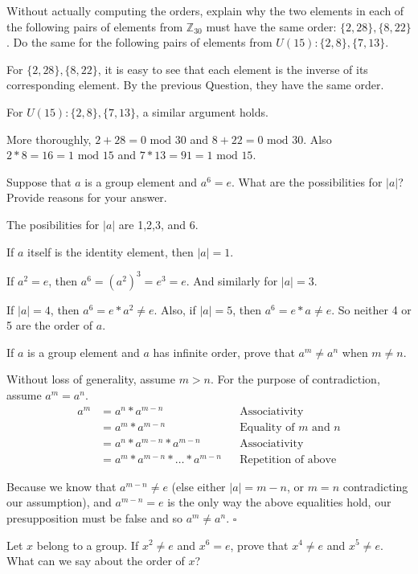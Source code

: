 \documentclass[11pt,largemargins]{homework}
\begin{document}
\question
Without actually computing the orders, explain why the two elements in each of the following pairs of elements from $\mathbb{Z}_{30}$ 
must have the same order: $\{2,28\}, \{8,22\}$. Do the same for the following pairs of elements from $U(15):\{2,8\}, \{7,13\}$.

\quad For $\{2,28\}, \{8,22\}$, it is easy to see that each element is the inverse of its corresponding element. By the previous 
Question, they have the same order.

\quad For $U(15):\{2,8\}, \{7,13\}$, a similar argument holds. 

\quad More thoroughly, $2+28 = 0\text{ mod }30$ and $8+22 = 0\text{ mod }30$. Also $2*8=16=1\text{ mod }15$ and 
$7*13=91=1\text{ mod }15$.

\question
Suppose that $a$ is a group element and $a^6=e$. What are the possibilities for $|a|$? Provide reasons for your answer.

\quad The posibilities for $|a|$ are 1,2,3, and 6. 

If $a$ itself is the identity element, then $|a|=1$. 

If $a^2=e$, then $a^6=(a^2)^3=e^3=e$. And similarly for $|a|=3$.

If $|a|=4$, then $a^6=e*a^2\neq e$. Also, if $|a|=5$, then $a^6=e*a\neq e$. So neither 4 or 5 are the order of $a$.

\question
If $a$ is a group element and $a$ has infinite order, prove that $a^m\neq a^n$ when $m\neq n$.

\quad Without loss of generality, assume $m>n$. For the purpose of contradiction, assume $a^m=a^n$.
\begin{align*}
    a^m &= a^n*a^{m-n}               &    &\text{Associativity}\\
        &= a^m*a^{m-n}               &    &\text{Equality of $m$ and $n$}\\
        &= a^n*a^{m-n}*a^{m-n}       &    &\text{Associativity}\\
        &= a^m*a^{m-n}*\dots*a^{m-n} &    &\text{Repetition of above}
\end{align*}

\quad Because we know that $a^{m-n}\neq e$ (else either $|a|=m-n$, or $m=n$ contradicting our assumption), and $a^{m-n}=e$ is the 
only way the above equalities hold, our presupposition must be false and so $a^m\neq a^n$. $\square$


\question
Let $x$ belong to a group. If $x^2\neq e$ and $x^6=e$, prove that $x^4\neq e$ and $x^5\neq e$. What can we say about the order of $x$?
\end{document}

